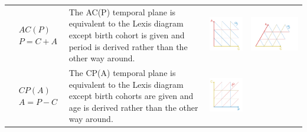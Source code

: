 \documentclass[12pt,oneside,a4paper]{article} %
\begin{document}
\begin{longtable}{m{}L{0.37\textwidth}m{0.17\textwidth}m{0.2\textwidth}}
  \\
  $$\begin{aligned}
    &AC(P) \\
    &P = C + A
  \end{aligned}$$ &
  The AC(P) temporal plane is equivalent to the Lexis diagram except birth
  cohort is given and period is derived rather than the other way around. &
  \includegraphics[scale=.5]{Figures/DiagramTable/AC_rt.pdf} & 
  \includegraphics[scale=.5]{Figures/DiagramTable/AC_iso.pdf}  \\
  $$\begin{aligned}
    &CP(A) \\
    &A = P - C
  \end{aligned}$$ &
  The CP(A) temporal plane is equivalent to the Lexis diagram except birth
  cohorts are given and age is derived rather than the other way around. &
  \includegraphics[scale=.5]{Figures/DiagramTable/CP_rt.pdf} & 

\end{longtable}
\end{document}
